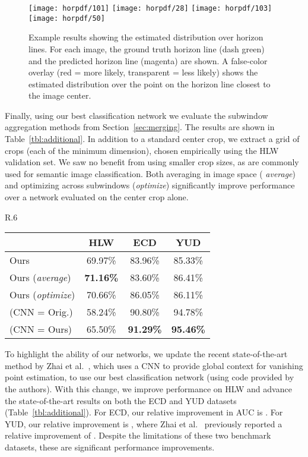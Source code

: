 \documentclass{bmvc2k}
\newcommand{\secref}[1]{Section~\ref{sec:#1}}
\newcommand{\tblref}[1]{Table~\ref{tbl:#1}}
\begin{document}
\begin{figure}
  \centering
  \texttt{[image: horpdf/101]}
  \texttt{[image: horpdf/28]}
  \texttt{[image: horpdf/103]}
  \texttt{[image: horpdf/50]}

  \caption{Example results showing the estimated distribution over
    horizon lines. For each image, the ground truth horizon line (dash
    green) and the predicted horizon line (magenta) are shown.  A
    false-color overlay (red = more likely, transparent = less likely)
    shows the estimated distribution over the point on the horizon
    line closest to the image center.}

  \label{fig:horizon_pdf}
\end{figure}

Finally, using our best classification network we evaluate the
subwindow aggregation methods from \secref{merging}. The results are
shown in \tblref{additional}. In addition to a standard center crop,
we extract a  grid of crops (each  of the minimum
dimension), chosen empirically using the HLW validation set. We saw no
benefit from using smaller crop sizes, as are commonly used for
semantic image classification. Both averaging in image space ({\em
average}) and optimizing across subwindows ({\em optimize})
significantly improve performance over a network evaluated on the
center crop alone. 

\begin{wraptable}{R}{.6\linewidth}
  \centering
  \caption{Evaluation of post-processing strategies.}
  \begin{tabular}{@{}lccc@{}}
    \toprule
    & HLW & ECD & YUD\\
    \hline
    Ours
    & 69.97\% & 83.96\% & 85.33\% \\
    Ours ({\em average}) 
    & \textbf{71.16\%} & 83.60\% & 86.41\% \\
    Ours ({\em optimize}) 
    & 70.66\% & 86.05\% & 86.11\% \\
    \midrule
    \cite{zhai2016context} (CNN = Orig.) 
      & 58.24\% & 90.80\% & 94.78\% \\
    \cite{zhai2016context} (CNN = Ours) 
    & 65.50\% & \textbf{91.29\%} & \textbf{95.46\%} \\
    \bottomrule
  \end{tabular}
  \label{tbl:additional}
\end{wraptable}

To highlight the ability of our networks, we update the recent
state-of-the-art method by Zhai et al.~\cite{zhai2016context}, which uses
a CNN to provide global context for vanishing point estimation, to use
our best classification network (using code provided by the authors).
With this change, we improve performance on HLW and advance the
state-of-the-art results on both the ECD and YUD datasets
(\tblref{additional}).  For ECD, our relative improvement in AUC is
.  For YUD, our relative improvement is , where Zhai et
al.~\cite{zhai2016context} previously reported a relative improvement
of . Despite the limitations of these two benchmark datasets,
these are significant performance improvements. 
\end{document}
